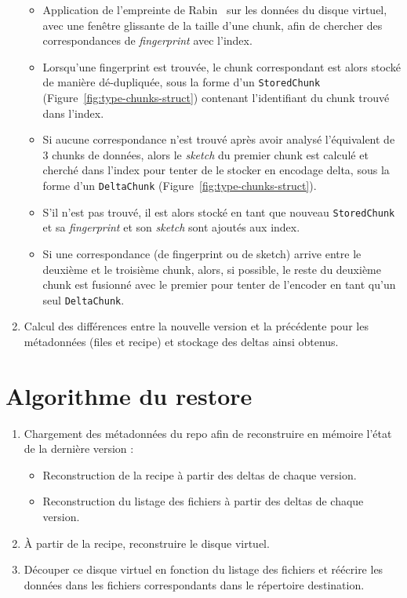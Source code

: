 \documentclass[a4paper]{report}
\begin{document}
\begin{enumerate}
  \begin{itemize}
  \item
    Application de l'empreinte de Rabin~\cite{rabin1981fingerprinting}
    sur les données du disque virtuel, avec une fenêtre glissante de la taille d'une chunk,
    afin de chercher des correspondances de \emph{fingerprint} avec l'index.
  \item
    Lorsqu'une fingerprint est trouvée, le chunk correspondant est alors
    stocké de manière dé-dupliquée, sous la forme d'un \verb|StoredChunk|
    (Figure~\ref{fig:type-chunks-struct})
    contenant l'identifiant du chunk trouvé dans l'index.
  \item
    Si aucune correspondance n'est trouvé après avoir analysé
    l'équivalent de 3 chunks de données,
    alors le \emph{sketch} du premier chunk est calculé et cherché dans l'index
    pour tenter de le stocker en encodage delta, sous la forme d'un \verb|DeltaChunk|
    (Figure~\ref{fig:type-chunks-struct}).
  \item
    S'il n'est pas trouvé, il est alors stocké en tant que nouveau \verb|StoredChunk|
    et sa \emph{fingerprint} et son \emph{sketch} sont ajoutés aux index.
  \item
    Si une correspondance (de fingerprint ou de sketch) arrive entre le deuxième
    et le troisième chunk, alors, si possible, le reste du deuxième chunk est
    fusionné avec le premier pour tenter de l'encoder en tant qu'un seul \verb|DeltaChunk|.
  \end{itemize}
\item
  Calcul des différences entre la nouvelle version et la précédente pour
  les métadonnées (files et recipe) et stockage des deltas ainsi obtenus.
\end{enumerate}

\section{Algorithme du restore}

\begin{enumerate}
\item
  Chargement des métadonnées du repo afin de reconstruire en
  mémoire l'état de la dernière version :

  \begin{itemize}
  \item
    Reconstruction de la recipe à partir des deltas de chaque version.
  \item
    Reconstruction du listage des fichiers à partir des deltas de chaque version.
  \end{itemize}
\item
  À partir de la recipe, reconstruire le disque virtuel.
\item
  Découper ce disque virtuel en fonction du listage des fichiers
  et réécrire les données dans les fichiers correspondants dans le répertoire destination.
\end{enumerate}
\end{document}
